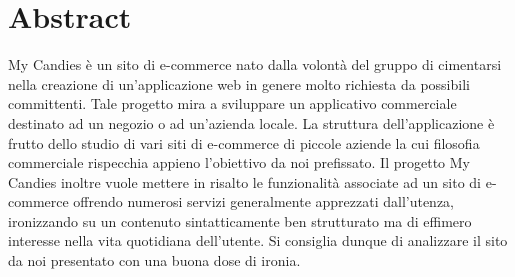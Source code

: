 \section{Abstract} 
My Candies è un sito di e-commerce nato dalla volontà del gruppo di cimentarsi nella creazione di un'applicazione web in genere molto richiesta da possibili committenti. 
Tale progetto mira a sviluppare un applicativo commerciale destinato ad un negozio o ad un'azienda locale.
La struttura dell'applicazione è frutto dello studio di vari siti di e-commerce  di piccole aziende  la cui filosofia commerciale rispecchia appieno l'obiettivo da noi prefissato. 
Il progetto My Candies inoltre vuole mettere in risalto le funzionalità associate ad un sito di e-commerce offrendo numerosi servizi generalmente apprezzati dall'utenza, ironizzando su un contenuto sintatticamente ben strutturato ma di effimero interesse nella vita quotidiana dell'utente. Si consiglia dunque di analizzare il sito da noi presentato con una buona dose di ironia.